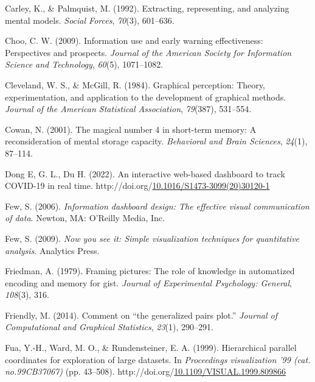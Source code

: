 \documentclass[print]{nuthesis}
\newlength{\cslhangindent}
\newenvironment{CSLReferences}[2]%
{\setlength{\parindent}{0pt}%
\everypar{\setlength{\hangindent}{\cslhangindent}}\ignorespaces}%
{\par}
\begin{document}
\begin{CSLReferences}{1}{0}
\leavevmode\hypertarget{ref-carley1992}{}%
Carley, K., \& Palmquist, M. (1992). Extracting, representing, and analyzing mental models. \emph{Social Forces}, \emph{70}(3), 601--636.

\leavevmode\hypertarget{ref-choo2009}{}%
Choo, C. W. (2009). Information use and early warning effectiveness: Perspectives and prospects. \emph{Journal of the American Society for Information Science and Technology}, \emph{60}(5), 1071--1082.

\leavevmode\hypertarget{ref-cleveland1984}{}%
Cleveland, W. S., \& McGill, R. (1984). Graphical perception: Theory, experimentation, and application to the development of graphical methods. \emph{Journal of the American Statistical Association}, \emph{79}(387), 531--554.

\leavevmode\hypertarget{ref-cowan2001}{}%
Cowan, N. (2001). The magical number 4 in short-term memory: A reconsideration of mental storage capacity. \emph{Behavioral and Brain Sciences}, \emph{24}(1), 87--114.

\leavevmode\hypertarget{ref-JHPHDashboard}{}%
Dong E, G. L., Du H. (2022). An interactive web-based dashboard to track COVID-19 in real time. http://doi.org/\href{https://doi.org/10.1016/S1473-3099(20)30120-1}{10.1016/S1473-3099(20)30120-1}

\leavevmode\hypertarget{ref-few}{}%
Few, S. (2006). \emph{Information dashboard design: The effective visual communication of data}. Newton, MA: O'Reilly Media, Inc.

\leavevmode\hypertarget{ref-few2009}{}%
Few, S. (2009). \emph{Now you see it: Simple visualization techniques for quantitative analysis}. Analytics Press.

\leavevmode\hypertarget{ref-friedman1979}{}%
Friedman, A. (1979). Framing pictures: The role of knowledge in automatized encoding and memory for gist. \emph{Journal of Experimental Psychology: General}, \emph{108}(3), 316.

\leavevmode\hypertarget{ref-friendly2014}{}%
Friendly, M. (2014). Comment on {``the generalized pairs plot.''} \emph{Journal of Computational and Graphical Statistics}, \emph{23}(1), 290--291.

\leavevmode\hypertarget{ref-fua1999}{}%
Fua, Y.-H., Ward, M. O., \& Rundensteiner, E. A. (1999). Hierarchical parallel coordinates for exploration of large datasets. In \emph{Proceedings visualization '99 (cat. no.99CB37067)} (pp. 43--508). http://doi.org/\href{https://doi.org/10.1109/VISUAL.1999.809866}{10.1109/VISUAL.1999.809866}


\end{CSLReferences}
\end{document}
